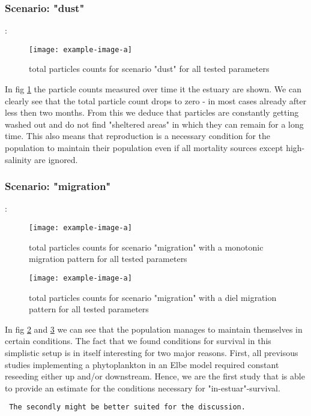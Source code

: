 \subsubsection*{Scenario: "dust"}: 
\begin{figure}
    \texttt{[image: example-image-a]}
    \caption[]{total particles counts for scenario "dust" for all tested parameters}
    \label{fig:dust_particle_counts}
\end{figure}
In fig \ref{fig:dust_particle_counts} the particle counts measured over time it the estuary are shown.
We can clearly see that the total particle count drops to zero - in most cases already after less then two months.
From this we deduce that particles are constantly getting washed out and do not find "sheltered areas" in which they can remain for a long time.
This also means that reproduction is a necessary condition for the population to maintain their population even if all mortality sources except high-salinity are ignored.


\subsubsection*{Scenario: "migration"}: 
\begin{figure}
    \texttt{[image: example-image-a]}
    \caption[]{total particles counts for scenario "migration" with a monotonic migration pattern for all tested parameters}
    \label{fig:monotonic_particle_counts}
\end{figure}
\begin{figure}
    \texttt{[image: example-image-a]}
    \caption[]{total particles counts for scenario "migration" with a diel migration pattern for all tested parameters}
    \label{fig:diel_particle_counts}
\end{figure}

In fig \ref{fig:monotonic_particle_counts} and \ref{fig:diel_particle_counts} we can see that the population manages to maintain themselves in certain conditions.
The fact that we found conditions for survival in this simplistic setup is in itself interesting for two major reasons.
First, all previsous studies implementing a phytoplankton in an Elbe model required constant reseeding either up and/or downstream.
Hence, we are the first study that is able to provide an estimate for the conditions necessary for "in-estuar"-survival.

\texttt{ The secondly might be better suited for the discussion.}

